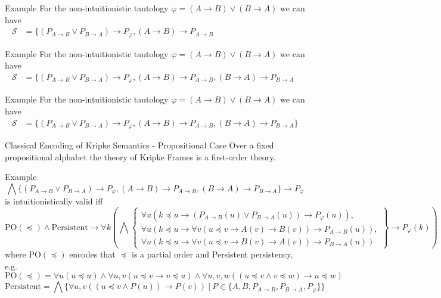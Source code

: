 \documentclass{cubeamer}
\begin{document}
	\begin{frame}{Example}
		For the non-intuitionistic tautology $\varphi = (A\to B)\vee (B\to A)$ we can have
		\begin{align*}
			\mathcal S &= \{(P_{A\to B}\vee P_{B\to A})\to P_\varphi, (A\to B)\to P_{A\to B}\phantom{, (B\to A)\to P_{B\to A}\}}
		\end{align*}
	\end{frame}

	\begin{frame}{Example}
		For the non-intuitionistic tautology $\varphi = (A\to B)\vee (B\to A)$ we can have
		\begin{align*}
			\mathcal S &= \{(P_{A\to B}\vee P_{B\to A})\to P_\varphi, (A\to B)\to P_{A\to B}, (B\to A)\to P_{B\to A}\phantom{\}}
		\end{align*}
	\end{frame}

	\begin{frame}{Example}
		For the non-intuitionistic tautology $\varphi = (A\to B)\vee (B\to A)$ we can have
		\begin{align*}
			\mathcal S &= \{(P_{A\to B}\vee P_{B\to A})\to P_\varphi, (A\to B)\to P_{A\to B}, (B\to A)\to P_{B\to A}\}
		\end{align*}
	\end{frame}
	
	\begin{frame}{Classical Encoding of Kripke Semantics - Propositional Case}
		Over a fixed propositional alphabet the theory of Kripke Frames is a first-order theory.
	\end{frame}
	
	\begin{frame}{Example}
		$$\bigwedge\{(P_{A\to B}\vee P_{B\to A})\to P_\varphi, (A\to B)\to P_{A\to B}, (B\to A)\to P_{B\to A}\} \to P_\varphi$$
		is intuitionistically valid iff
		$$\text{PO}(\preceq)\wedge\text{Persistent}\to \forall k\left(\bigwedge\left\{\substack{\forall u(k\preceq u\to (P_{A\to B}(u)\vee P_{B\to A}(u))\to P_\varphi(u)),\\ \forall u(k\preceq u\to \forall v(u\preceq v\to A(v)\to B(v))\to P_{A\to B}(u)),\\\forall u(k\preceq u\to \forall v(u\preceq v\to B(v)\to A(v))\to P_{B\to A}(u))}\right\} \to P_\varphi(k)\right)$$
		where PO$(\preceq)$ encodes that $\preceq$ is a partial order and Persistent persistency, e.g. $$\text{PO}(\preceq) = \forall u(u\preceq u)\wedge\forall u,v(u\preceq v\to v\preceq u)\wedge\forall u, v, w((u\preceq v\wedge v\preceq w)\to u\preceq w)$$
		$$\text{Persistent} = \bigwedge\{\forall u, v((u\preceq v\wedge P(u))\to P(v))\:|\:P\in\{A, B, P_{A\to B}, P_{B\to A}, P_\varphi\}\}$$
	\end{frame}
	
\end{document}
